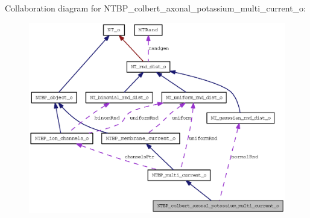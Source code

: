Collaboration diagram for NTBP\_\-colbert\_\-axonal\_\-potassium\_\-multi\_\-current\_\-o:
\nopagebreak
\begin{figure}[H]
\begin{center}
\leavevmode
\includegraphics[width=400pt]{class_n_t_b_p__colbert__axonal__potassium__multi__current__o__coll__graph}
\end{center}
\end{figure}
